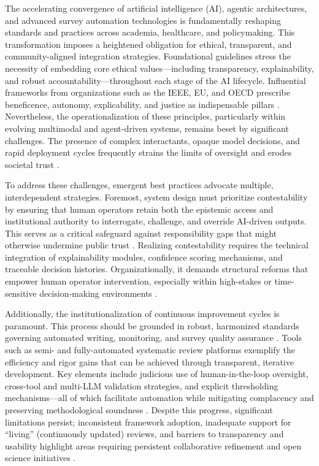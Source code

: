 \documentclass[11pt]{article}
\begin{document}
The accelerating convergence of artificial intelligence (AI), agentic architectures, and advanced survey automation technologies is fundamentally reshaping standards and practices across academia, healthcare, and policymaking. This transformation imposes a heightened obligation for ethical, transparent, and community-aligned integration strategies. Foundational guidelines stress the necessity of embedding core ethical values—including transparency, explainability, and robust accountability—throughout each stage of the AI lifecycle. Influential frameworks from organizations such as the IEEE, EU, and OECD prescribe beneficence, autonomy, explicability, and justice as indispensable pillars \cite{95,96,100,106,109,110}. Nevertheless, the operationalization of these principles, particularly within evolving multimodal and agent-driven systems, remains beset by significant challenges. The presence of complex interactants, opaque model decisions, and rapid deployment cycles frequently strains the limits of oversight and erodes societal trust \cite{98,100,106}.

To address these challenges, emergent best practices advocate multiple, interdependent strategies. Foremost, system design must prioritize contestability by ensuring that human operators retain both the epistemic access and institutional authority to interrogate, challenge, and override AI-driven outputs. This serves as a critical safeguard against responsibility gaps that might otherwise undermine public trust \cite{97,98,100}. Realizing contestability requires the technical integration of explainability modules, confidence scoring mechanisms, and traceable decision histories. Organizationally, it demands structural reforms that empower human operator intervention, especially within high-stakes or time-sensitive decision-making environments \cite{96,97,100,106}.

Additionally, the institutionalization of continuous improvement cycles is paramount. This process should be grounded in robust, harmonized standards governing automated writing, monitoring, and survey quality assurance \cite{74,75,80,84,98,100,102,104,106}. Tools such as semi- and fully-automated systematic review platforms exemplify the efficiency and rigor gains that can be achieved through transparent, iterative development. Key elements include judicious use of human-in-the-loop oversight, cross-tool and multi-LLM validation strategies, and explicit thresholding mechanisms—all of which facilitate automation while mitigating complacency and preserving methodological soundness \cite{74,80,84,100,102,104}. Despite this progress, significant limitations persist; inconsistent framework adoption, inadequate support for “living” (continuously updated) reviews, and barriers to transparency and usability highlight areas requiring persistent collaborative refinement and open science initiatives \cite{75,80,104,106}.
\end{document}
